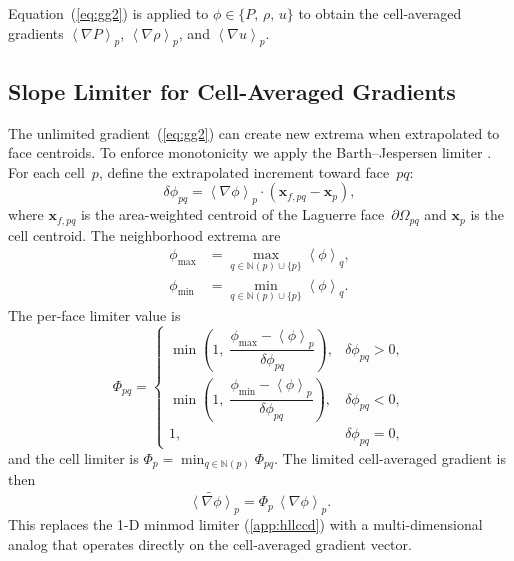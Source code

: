 \documentclass[twocolumn]{aastex63}
\newcommand{\vel}{{u}}
\newcommand{\vect}[1]{\mathbf{#1}}
\begin{document}
Equation~(\ref{eq:gg2}) is applied to $\phi \in \{P,\,\rho,\,\vel\}$
to obtain the cell-averaged gradients
$\left<\nabla P\right>_p$,
$\left<\nabla\rho\right>_p$, and
$\left<\nabla\vel\right>_p$.


\subsection{Slope Limiter for Cell-Averaged Gradients}

The unlimited gradient~(\ref{eq:gg2}) can create new extrema
when extrapolated to face centroids.
To enforce monotonicity we apply the Barth--Jespersen limiter
\citep{barth1989}.
For each cell~$p$, define the extrapolated increment toward face~$pq$:
\begin{equation}
  \delta\phi_{pq}
  = \left<\nabla\phi\right>_p \cdot
    (\vect{x}_{f,pq} - \vect{x}_p),
\end{equation}
where $\vect{x}_{f,pq}$ is the area-weighted centroid of the
Laguerre face~$\partial\Omega_{pq}$ and $\vect{x}_p$ is the
cell centroid.
The neighborhood extrema are
\begin{equation}
  \begin{aligned}
  \phi_{\max} &= \max_{q\in\mathbb{N}(p)\cup\{p\}}
    \left<\phi\right>_q,\\
  \phi_{\min} &= \min_{q\in\mathbb{N}(p)\cup\{p\}}
    \left<\phi\right>_q.
  \end{aligned}
\end{equation}
The per-face limiter value is
\begin{equation}
  \Phi_{pq} = \begin{cases}
    \min\!\left(1,\;
      \dfrac{\phi_{\max} - \left<\phi\right>_p}
            {\delta\phi_{pq}}\right),
      & \delta\phi_{pq} > 0, \\[8pt]
    \min\!\left(1,\;
      \dfrac{\phi_{\min} - \left<\phi\right>_p}
            {\delta\phi_{pq}}\right),
      & \delta\phi_{pq} < 0, \\[8pt]
    1, & \delta\phi_{pq} = 0,
  \end{cases}
\end{equation}
and the cell limiter is
$\Phi_p = \min_{q\in\mathbb{N}(p)} \Phi_{pq}$.
The limited cell-averaged gradient is then
\begin{equation}\label{eq:limgrad}
  \widetilde{\left<\nabla\phi\right>}_p
  = \Phi_p\,\left<\nabla\phi\right>_p.
\end{equation}
This replaces the 1-D minmod limiter
(\ref{app:hllccd})
with a multi-dimensional analog that operates directly
on the cell-averaged gradient vector.
\end{document}
